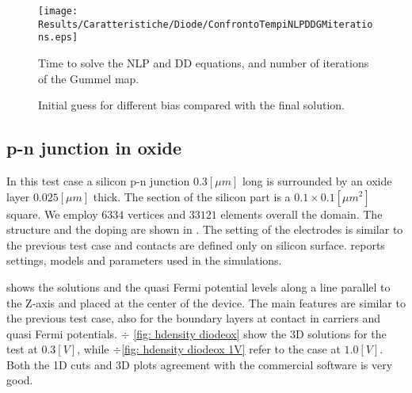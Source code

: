  
 \begin{figure}[!t]
\centering
\texttt{[image: Results/Caratteristiche/Diode/ConfrontoTempiNLPDDGMiterations.eps]}
\caption{Time to solve the NLP and DD equations, and number of  iterations of the Gummel map.}
\label{fig: tempi computazionali 2}
\end{figure}

\begin{figure}[!b]
\centering
{}
\caption{Initial guess for different bias compared with the final solution.}
\label{fig: different biast initial step}
\end{figure}
 



\clearpage


\subsection{p-n junction in oxide}
\label{sec: PNOX}

In this test case a silicon p-n junction $0.3[\mu m]$ long is surrounded by an oxide layer $0.025[\mu m]$ thick. The section of the silicon part is a $0.1 \times 0.1 [\mu m^2]$ square.  We employ $6334$ vertices and $33121$ elements overall the domain. The structure and the doping are shown in . The setting of the electrodes is similar to the previous test case and contacts are defined only on silicon surface. 
 reports settings, models and parameters used in the simulations.

 shows the solutions and the quasi Fermi potential levels along a line parallel to the Z-axis and placed at the center of the device. The main features are similar to the previous test case, also for the boundary layers at contact in carriers and quasi Fermi potentials.
 $\div$ \ref{fig: hdensity diodeox} show the 3D solutions for the test at $0.3[V]$, while $\div$\ref{fig: hdensity diodeox 1V} refer to the case at $1.0[V]$. Both the 1D cuts and 3D plots agreement with the commercial software is very good. 

\vspace{0.5cm}

